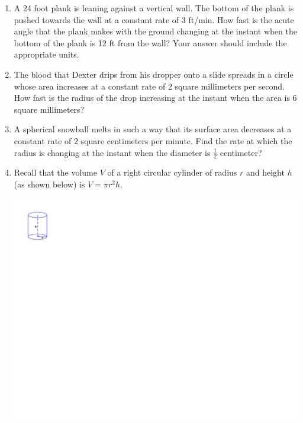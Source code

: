 \documentclass[12pt]{article}
\newif\ifans
\begin{document}
\begin{enumerate}
\ifans{\fbox{25 miles per hour}} \fi

\item A 24 foot plank is leaning against a vertical wall.  The bottom of the plank is pushed towards the wall at a constant rate of 3 ft/min.  How fast is the acute angle that the plank makes with the ground changing at the instant when the bottom of the plank is 12 ft from the wall?  Your answer should include the appropriate units.

\ifans{\fbox{$\frac{1}{4\sqrt{3}}$ radians per minute}} \fi

\item The blood that Dexter drips from his dropper onto a slide spreads in a circle whose area increases at a constant rate of 2 square millimeters per second.  How fast is the radius of the drop increasing at the instant when the area is 6 square millimeters? 

\ifans{\fbox{$\frac{1}{\sqrt{6\pi}}$ millimeters per second}} \fi

\item A spherical snowball melts in such a way that its surface area decreases at a constant rate of 2 square centimeters per minute.  Find the rate at which the radius is changing at the instant when the diameter is $\frac{1}{2}$ centimeter?

\ifans{\fbox{$-\frac{1}{\pi}$ cm per min}} \fi

\item Recall that the volume $V$ of a right circular cylinder of radius $r$ and height $h$ (as shown below) is $V=\pi r^2h$.
\begin{center}
\includegraphics[scale=.85]{cylinder.pdf}
\end{center}


\end{enumerate}
\end{document}

